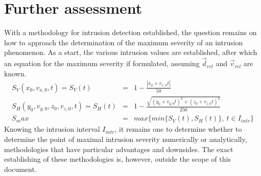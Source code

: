 \documentclass{article}
\begin{document}
\section*{Further assessment}
With a methodology for intrusion detection established, the question remains on how to approach the determination of the maximum severity of an intrusion phenomenon. As a start, the various intrusion values are established, after which an equation for the maximum severity if formulated, assuming $\vec{d}_{rel}$ and $\vec{v}_{rel}$ are known.
\begin{eqnarray*}
S_V(x_0,v_{x,0},t) = S_V(t) &=& 1-\frac{|x_0+v_{x,0}t|}{50} \\
S_H(y_0,v_{y,0},z_0,v_{z,0},t) = S_H(t) &=& 1-\frac{\sqrt{(y_0+v_{y,0}t)^2+(z_0+v_{z,0}t)^2}}{250}\\
S_max &=& max\{min\{S_V(t),S_H(t)\},\ t\in I_{intr} \}
\end{eqnarray*}
\noindent
Knowing the intrusion interval $I_{intr}$, it remains one to determine whether to determine the point of maximal intrusion severity numerically or analytically, methodologies that have particular advantages and downsides. The exact establishing of these methodologies is, however, outside the scope of this document.
\end{document}
